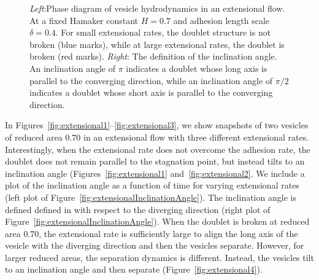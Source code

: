 \documentclass[prf,superscriptaddress,showpacs]{revtex4-1}
\begin{document}
\begin{figure}[htp]
\begin{minipage}{0.33\textwidth}
  \end{minipage}
  \caption{\label{fig:extensionalPhaseDiagram} {\em Left}:Phase diagram
  of vesicle hydrodynamics in an extensional flow.  At a fixed Hamaker
  constant $H=0.7$ and adhesion length scale $\delta=0.4$.  For small
  extensional rates, the doublet structure is not broken (blue marks),
  while at large extensional rates, the doublet is broken (red marks).
  {\em Right}: The definition of the inclination angle.  An inclination
  angle of $\pi$ indicates a doublet whose long axis is parallel to the
  converging direction, while an inclination angle of $\pi/2$ indicates
  a doublet whose short axis is parallel to the converging direction.}
\end{figure}

In Figures~\ref{fig:extensional1}--\ref{fig:extensional3}, we show
snapshots of two vesicles of reduced area $0.70$ in an extensional flow
with three different extensional rates.  Interestingly, when the
extensional rate does not overcome the adhesion rate, the doublet does
not remain parallel to the stagnation point, but instead tilts to an
inclination angle (Figures~\ref{fig:extensional1}
and~\ref{fig:extensional2}.  We include a plot of the inclination angle
as a function of time for varying extensional rates (left plot of
Figure~\ref{fig:extensionalInclinationAngle}).  The inclination angle is
defined defined in with respect to the diverging direction (right plot
of Figure~\ref{fig:extensionalInclinationAngle}).  When the doublet is
broken at reduced area $0.70$, the extensional rate is sufficiently
large to align the long axis of the vesicle with the diverging direction
and then the vesicles separate.  However, for larger reduced areas, the
separation dynamics is different.  Instead, the vesicles tilt to an
inclination angle and then separate (Figure~\ref{fig:extensional4}).
\end{document}
